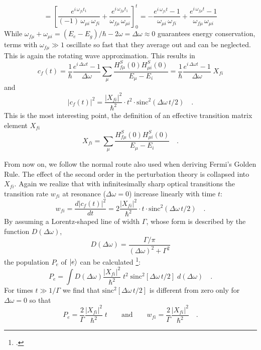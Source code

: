 \begin{equation}
= \left[  \frac{e^{i \,\omega_{fi} t_1}}{(-1)
\,\omega_{\mu i} \, \omega_{fi}} %
+   \frac{e^{i \,\omega_{ f \mu } t_1}}{\omega_{f \mu}\,
\omega_{\mu i}} \right]_0^t %
= -  \frac{e^{i \,\omega_{fi} t} -1}{
\omega_{\mu i} \, \omega_{fi} } %
+   \frac{e^{i \,\omega_{ f \mu } t} -1}{\omega_{f \mu}\,
\omega_{\mu i}}  %
\end{equation}
While $\omega_{f \mu}+\omega_{ \mu i}= (E_e - E_g)/ \hbar - 2 \omega = \Delta \omega \approx 0$ guarantees  energy conservation,  terms with 
 $\omega_{f \mu} \gg 1$ oscillate so fast that they
 average out and can be neglected. This is again the rotating wave approximation. This   results in
\begin{equation}
c_f(t) =  \frac{1}{\hbar} \frac{e^{i \,\Delta \omega t} -1}{
\Delta \omega } \sum_{\mu} \frac{H^S_{f \mu} (0) H^S_{\mu i}
(0)}{E_{\mu} - E_i} =  \frac{1}{\hbar} \frac{e^{i \,\Delta \omega t}
-1}{ \Delta \omega } \; X_{fi}
\end{equation}
and
\begin{equation}
|c_f(t)|^2 = \frac{|X_{fi}|^2}{\hbar^2} \cdot t^2 \cdot
\text{sinc}^2(\Delta \omega \,t / 2) \quad .
\end{equation}
This is the most interesting point, the definition of an effective transition  matrix element $X_{fi}$
\begin{equation}
X_{fi} = \sum_{\mu} \frac{H^S_{f \mu} (0) H^S_{\mu i}
(0)}{E_{\mu} - E_i}  \quad .
\end{equation}

From now on, we follow the normal route also used when deriving Fermi's Golden Rule. The effect of the second order in the perturbation theory is collapsed into  $X_{fi}$. Again we realize that with
 infinitesimally sharp optical transitions
the transition rate $w_{fi}$ at resonance ($\Delta \omega =
0$) increase linearly with time $t$:
\begin{equation}
 w_{fi} = \frac{d |c_f(t)|^2}{dt} = 2 \frac{|X_{fi}|^2}{\hbar^2} \cdot t \cdot
\text{sinc}^2(\Delta \omega \,t / 2) \quad .
\end{equation}
By assuming a Lorentz-shaped line of width $\Gamma$, whose
form is described by the function $D(\Delta \omega)$,
\begin{equation}
D(\Delta \omega) = \frac{\Gamma / \pi}{(\Delta \omega)^2 +
\Gamma^2}
\end{equation}
the population $P_e$ of $\ket{e}$ can be calculated 
\footcite{mystre_quantum_optics}:
\begin{equation}
P_e = \int D(\Delta \omega) \frac{|X_{fi}|^2}{\hbar^2} \; t^2 \;
\text{sinc}^2\left[ \Delta \omega  \,t / 2 \right] \; d (\Delta
\omega) \quad .
\end{equation}
For times $t \gg 1 / \Gamma$ we find that $\text{sinc}^2\left[ \Delta
\omega \,t / 2 \right]$ is different from zero only for $\Delta \omega = 0$  so that
\begin{equation}
P_e =  \frac{2}{ \Gamma} \frac{|X_{fi}|^2}{ \hbar^2} \; t \qquad
\text{and} \qquad w_{fi} =  \frac{2}{ \Gamma} \frac{|X_{fi}|^2}{
\hbar^2} \quad . \label{eq:tpe_pe_xfi}
\end{equation}

